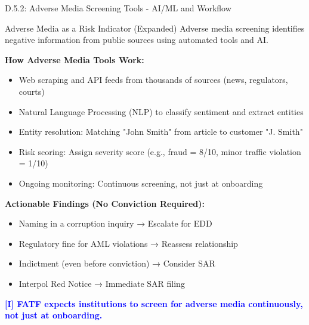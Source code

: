 \documentclass[11pt,a4paper]{beamer}
\newcommand{\bluenote}[1]{\textcolor{blue}{\textbf{[I] #1}}}
\begin{document}
\begin{frame}{D.5.2: Adverse Media Screening Tools - AI/ML and Workflow}
	\begin{block}{Adverse Media as a Risk Indicator (Expanded)}
		Adverse media screening identifies negative information from public sources using automated tools and AI.
	\end{block}
	\textbf{How Adverse Media Tools Work:}
	\begin{itemize}
		\item Web scraping and API feeds from thousands of sources (news, regulators, courts)
		\item Natural Language Processing (NLP) to classify sentiment and extract entities
		\item Entity resolution: Matching "John Smith" from article to customer "J. Smith"
		\item Risk scoring: Assign severity score (e.g., fraud = 8/10, minor traffic violation = 1/10)
		\item Ongoing monitoring: Continuous screening, not just at onboarding
	\end{itemize}
	\textbf{Actionable Findings (No Conviction Required):}
	\begin{itemize}
		\item Naming in a corruption inquiry → Escalate for EDD
		\item Regulatory fine for AML violations → Reassess relationship
		\item Indictment (even before conviction) → Consider SAR
		\item Interpol Red Notice → Immediate SAR filing
	\end{itemize}
	\bluenote{FATF expects institutions to screen for adverse media continuously, not just at onboarding.}
\end{frame}
\end{document}
